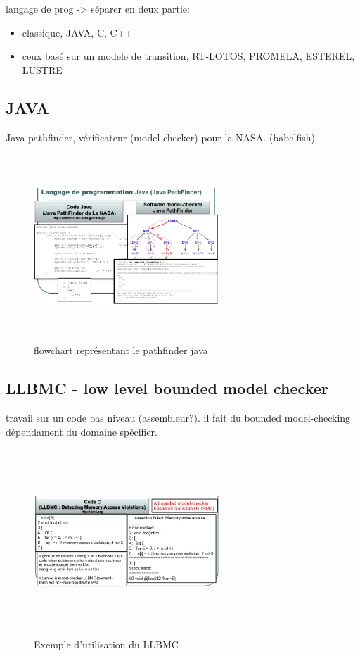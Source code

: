 \documentclass[oneside]{book}
\begin{document}
    langage de prog -> séparer en deux partie:
    \begin{itemize}
        \item classique, JAVA, C, C++
        \item ceux basé sur un modele de transition, RT-LOTOS, PROMELA, ESTEREL, LUSTRE
    \end{itemize}
    
    \subsection{JAVA}
    
    Java pathfinder, vérificateur (model-checker) pour la NASA. (babelfish). \\
    
    \begin{figure}[!ht]
    	\centering
    	\includegraphics[width = 7cm, height = 7cm, keepaspectratio]{Images/java_pathfinder.png}
    	\caption{flowchart représentant le pathfinder java}
    	\label{fig:JavaPathfinder}
    \end{figure}
    
    \subsection{LLBMC - low level bounded model checker}
    travail sur un code bas niveau (assembleur?). il fait du bounded model-checking dépendament du domaine spécifier.\\
    
    \begin{figure}[!ht]
    	\centering
    	\includegraphics[width = 7cm, height = 7cm, keepaspectratio]{Images/llbmc.png}
    	\caption{Exemple d'utilisation du LLBMC}
    	\label{fig:LLBMC}
    \end{figure}
    
\end{document}
